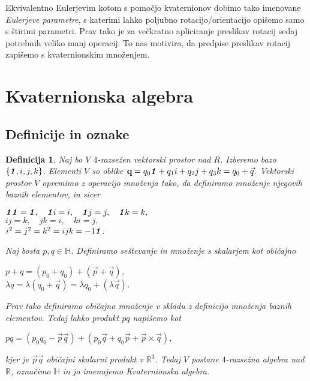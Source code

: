 \documentclass[a4paper,12pt]{article}
\def\R{\mathbb{R}} %
\def\H{\mathbb{H}} %
\def\1{\textbf{\emph{1}}}
\newtheorem{definicija}{Definicija}
\begin{document}
Ekvivalentno Eulerjevim kotom s pomočjo kvaternionov dobimo tako imenovane \emph{Eulerjeve parametre}, s katerimi
lahko poljubno rotacijo/orientacijo opišemo samo s štirimi parametri. Prav tako je za večkratno apliciranje preslikav rotacij sedaj
potrebnih veliko manj operacij. To nas motivira, da predpise preslikav rotacij zapišemo s kvaternionskim množenjem.



\section{Kvaternionska algebra}
\subsection{Definicije in oznake}

\begin{definicija}
Naj bo $V$ $4$-razsežen vektorski prostor nad $R$. Izberemo bazo $\left\{\1, i, j, k\right\}$. Elementi $V$ so oblike $\textbf{q} = q_{0}\1 + q_{1}i + q_{2}j + q_{3}k = q_{0} + \vec{q}.$
Vektorski prostor $V$ opremimo z operacijo množenja tako, da definiramo množenje njegovih baznih elementov, in sicer
\begin{center}
   $\1 \1 = \1, \hspace{1em}  \1i = i, \hspace{1em} \1j = j, \hspace{1em} \1k = k,$\\
   $ij = k, \hspace{1em} jk = i, \hspace{1em} ki = j,$\\
   $i^2 = j^2 = k^2 = ijk = -1\1$.
\end{center}

Naj bosta $p, q \in \H$. Definiramo seštevanje in množenje s skalarjem kot običajno
\begin{center}
   $p + q = \left( p_{0} + q_{0} \right) + \left( \vec{p} + \vec{q} \right)$, \\
   $ \lambda q = \lambda \left(q_{0} + \vec{q} \right) = \lambda q_{0} + \left(\lambda \vec{q}\right) $.
\end{center}
Prav tako definiramo običajno množenje v skladu z definicijo množenja baznih elementov. Tedaj lahko
produkt $pq$ napišemo kot
\begin{center}
   $pq = (p_{0} q_{0} - \vec{p} \vec{q}) + (p_{0}\vec{q} + q_{0}\vec{p} + \vec{p}\times\vec{q})$,
\end{center}
kjer je $\vec{p}\vec{q}$ običajni skalarni produkt v $\R^3$.
Tedaj $V$ postane $4$-razsežna algebra nad $\R$, označimo $\H$ in jo imenujemo \emph{Kvaternionska algebra}.
~\cite{dam1998quaternions}
\end{definicija}
\end{document}
